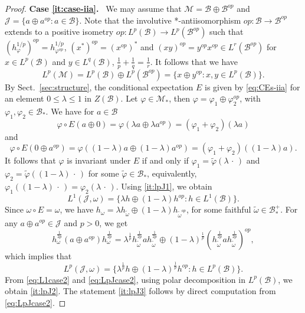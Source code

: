 \documentclass[12pt]{article}
\def\Me{\mathcal M}
\def\Je{\mathcal J}
\def\Be{\mathcal B}
\theoremstyle{definition}
\theoremstyle{remark}
\begin{document}
\begin{proof}
\textbf{Case \ref{it:case-iia}.}~
We may assume that $\Me=\Be\oplus\Be^{op}$ and $\Je=\{a\oplus a^{op}\colon
a\in \Be\}$. Note that the involutive *-antiisomorphism  $op: \Be\to \Be^{op}$ extends to a
positive  isometry $op: L^p(\Be)\to L^p(\Be^{op})$ such that
$(h^{1/p}_\varphi)^{op}=h^{1/p}_{\varphi^{op}}$, $(x^*)^{op}=(x^{op})^*$ and $(xy)^{op}=y^{op}x^{op}\in L^r(\Be^{op})$ for $x\in
L^p(\Be)$ and $y\in L^q(\Be)$, $\frac1p+\frac1q=\frac1r$. It follows that we have 
\begin{equation}\label{eq:Lpcase2}
L^p(\Me)=L^p(\Be)\oplus L^p(\Be^{op})=\{x\oplus y^{op}\colon x,y\in L^p(\Be)\}.
\end{equation}
By Sect.~\ref{sec:structure}, the conditional expectation $E$ is given by \eqref{eq:CEs-iia} for an element $0\le \lambda\le1$ in $Z(\Be)$.
Let $\varphi\in \Me_*$, then $\varphi=\varphi_1\oplus\varphi_2^{op}$, with
$\varphi_1,\varphi_2\in \Be_*$. 
We have for $a\in \Be$
\[
\varphi\circ E(a\oplus 0)=\varphi(\lambda a\oplus \lambda a^{op})=(\varphi_1+\varphi_2)(\lambda a)
\]
and 
\[
\varphi\circ E(0\oplus a^{op})=\varphi((1-\lambda) a\oplus (1- \lambda)
a^{op})=(\varphi_1+\varphi_2)((1-\lambda) a).
\]
It follows that $\varphi$ is invariant under $E$ if and only if $\varphi_1=\tilde
\varphi(\lambda\,\cdot\,)$ and $\varphi_2=\tilde \varphi((1-\lambda)\,\cdot\,)$ for some
$\tilde\varphi\in \Be_*$, equivalently, 
$\varphi_1((1-\lambda)\,\cdot\,)=\varphi_2(\lambda\,\cdot\,)$. Using \ref{it:lpJ1}, we obtain
\begin{equation}\label{eq:L1case2}
L^1(\Je,\omega)=\{\lambda h\oplus (1-\lambda)h^{op}\colon h\in L^1(\Be)\}.
\end{equation}
Since $\omega\circ E=\omega$, we have $h_\omega=\lambda h_{\tilde\omega}\oplus
(1-\lambda)h_{\tilde\omega^{op}}$, for some faithful $\tilde\omega\in \Be_*^+$.
For any $a\oplus a^{op}\in \Je$ and $p>0$, we get
\[
h_\omega^{\frac1{2p}}(a\oplus
a^{op})h_\omega^{\frac1{2p}}=\lambda^{\frac1p}h_{\tilde\omega}^{\frac1{2p}}ah_{\tilde\omega}^{\frac1{2p}}\oplus
(1-\lambda)^{\frac1p}(h_{\tilde\omega}^{\frac1{2p}}ah_{\tilde\omega}^{\frac1{2p}})^{op},
\]
which implies that
\begin{equation}\label{eq:LpJcase2}
L^p(\Je,\omega)=\{\lambda^{\frac1p}h\oplus (1-\lambda)^{\frac1p}h^{op}\colon h\in
L^p(\Be)\}.
\end{equation}
From \eqref{eq:L1case2} and \eqref{eq:LpJcase2}, using polar decomposition in $L^p(\Be)$,
we obtain \ref{it:lpJ2}. The statement \ref{it:lpJ3} follows by direct computation from
\eqref{eq:LpJcase2}.  


\end{proof}
\end{document}
